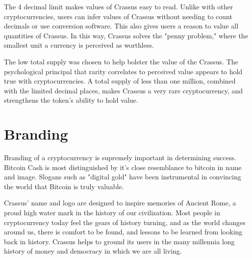 \documentclass[12pt]{article}
\begin{document}
The 4 decimal limit makes values of Crassus easy to read.  Unlike with other cryptocurrencies, users can infer values of Crassus without needing to count decimals or use conversion software.  This also gives users a reason to value all quantities of Crassus.  In this way, Crassus solves the "penny problem," where the smallest unit a currency is perceived as worthless.

The low total supply was chosen to help bolster the value of the Crassus.  The psychological principal that rarity correlates to perceived value appears to hold true with cryptocurrencies.  A total supply of less than one million, combined with the limited decimal places, makes Crassus a very rare cryptocurrency, and strengthens the token's ability to hold value.


\section{Branding}\label{Branding}
Branding of a cryptocurrency is supremely important in determining success.  Bitcoin Cash is most distinguished by it's close resemblance to bitcoin in name and image.  Slogans such as "digital gold" have been instrumental in convincing the world that Bitcoin is truly valuable.

Crassus' name and logo are designed to inspire memories of Ancient Rome, a proud high water mark in the history of our civilization.  Most people in cryptocurrency today feel the gears of history turning, and as the world changes around us, there is comfort to be found, and lessons to be learned from looking back in history.  Crassus helps to ground its users in the many millennia long history of money and democracy in which we are all living.



\end{document}
